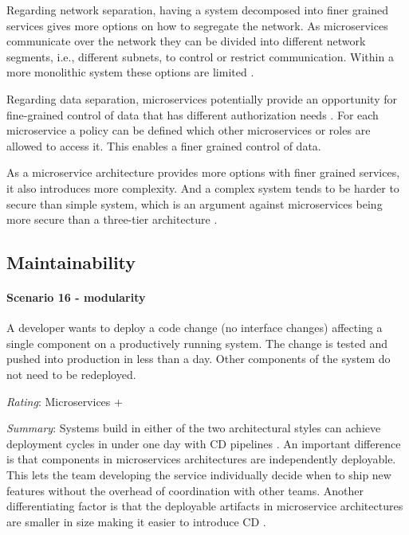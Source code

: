 Regarding network separation, having a system decomposed into finer grained services gives more options on how to segregate the network. 
As microservices communicate over the network they can be divided into different network segments, i.e., different subnets, to control or restrict communication.
Within a more monolithic system these options are limited \citep[p. 183]{Newman2015}.

Regarding data separation, microservices potentially provide an opportunity for fine-grained control of data that has different authorization needs \cite{FowlerTradeoffsDistribution2015}.
For each microservice a policy can be defined which other microservices or roles are allowed to access it.
This enables a finer grained control of data.

As a microservice architecture provides more options with finer grained services, it also introduces more complexity.
And a complex system tends to be harder to secure than simple system, which is an argument against microservices being more secure than a three-tier architecture \cite{Schneier2000}.

\subsection{Maintainability}
\label{quaMicro:modifiability}

\paragraph{Scenario 16 - modularity}
A developer wants to deploy a code change (no interface changes) affecting a single component on a productively running system. The change is tested and pushed into production in less than a day. Other components of the system do not need to be redeployed.
\label{quaMicro:s16}
 
\textit{Rating}: Microservices +

\textit{Summary}:
Systems build in either of the two architectural styles can achieve deployment cycles in under one day with \ac{CD} pipelines \cite{Cockcroft2014} \cite{Etsy2014}.
An important difference is that components in microservices architectures are independently deployable.
This lets the team developing the service individually decide when to ship new features without the overhead of coordination with other teams.
Another differentiating factor is that the deployable artifacts in microservice architectures are smaller in size making it easier to introduce \ac{CD} \citep[p. 5]{Wolff2016}.

